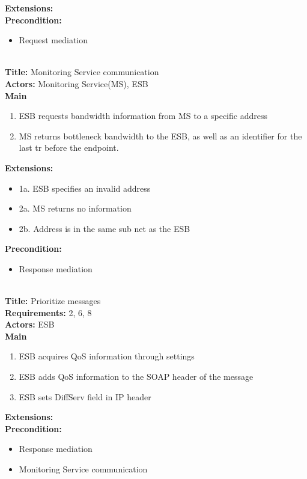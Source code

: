     \textbf{Extensions:} \\
    \textbf{Precondition:}
    \begin{itemize}
        \item Request mediation
    \end{itemize}
    \\
    \textbf{Title:} Monitoring Service communication\\
    \textbf{Actors:} Monitoring Service(MS), ESB\\
    \textbf{Main}
    \begin{enumerate}
        \item ESB requests bandwidth information from MS to a specific address
        \item MS returns bottleneck bandwidth to the ESB, as well as an identifier for the last \gls{tr} before the endpoint.
    \end{enumerate}
    \textbf{Extensions:}
    \begin{itemize}
        \item[]	1a. ESB specifies an invalid address
        \item[]	2a. MS returns no information
        \item[]	2b. Address is in the same sub net as the ESB
    \end{itemize}
    \textbf{Precondition:}
    \begin{itemize}
        \item Response mediation
    \end{itemize}
    \\
    \textbf{Title:} Prioritize messages\\
    \textbf{Requirements:} 2, 6, 8\\
    \textbf{Actors:} ESB\\
    \textbf{Main}
    \begin{enumerate}
        \item ESB acquires QoS information through settings
        \item ESB adds QoS information to the SOAP header of the message
        \item ESB sets DiffServ field in IP header
    \end{enumerate}
    \textbf{Extensions:}\\
    \textbf{Precondition:}
    \begin{itemize}
        \item Response mediation
        \item Monitoring Service communication
    \end{itemize}

